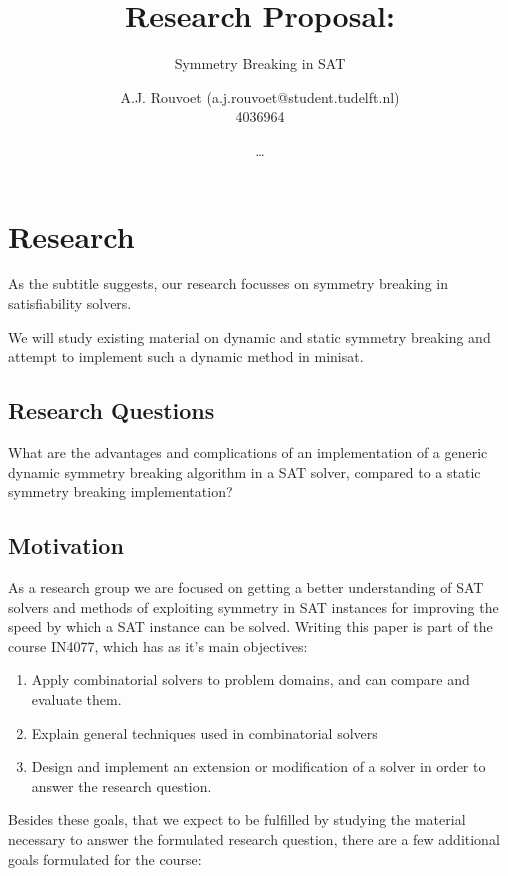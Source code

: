 

	\title{Research Proposal:}
	\author{
		A.J. Rouvoet (a.j.rouvoet@student.tudelft.nl) \\ 4036964 \and
		\ldots
	}

	\subtitle{Symmetry Breaking in SAT}



	\maketitle
	\newpage

	\section{Research}
	As the subtitle suggests, our research focusses on symmetry breaking in satisfiability solvers.

	We will study existing material on dynamic and static symmetry breaking and attempt to implement such a dynamic method in minisat.

		\subsection{Research Questions}
		What are the advantages and complications of an implementation of a generic dynamic	symmetry breaking algorithm in a SAT solver, compared to a static symmetry breaking implementation?

		\subsection{Motivation}
			As a research group we are focused on getting a better understanding of SAT solvers and methods of exploiting symmetry in SAT instances for improving the speed by which a SAT	instance can be solved.	Writing this paper is part of the course IN4077, which has as it's main objectives:

			\begin{enumerate}
				\item
					Apply combinatorial solvers to problem domains, and can compare and evaluate them.
				\item
					Explain general techniques used in combinatorial solvers
				\item
					Design and implement an extension or modification of a solver in order to answer the research question.
			\end{enumerate}

			Besides these goals, that we expect to be fulfilled by studying the material necessary to answer the formulated research question, there are a few additional goals formulated for the course:

